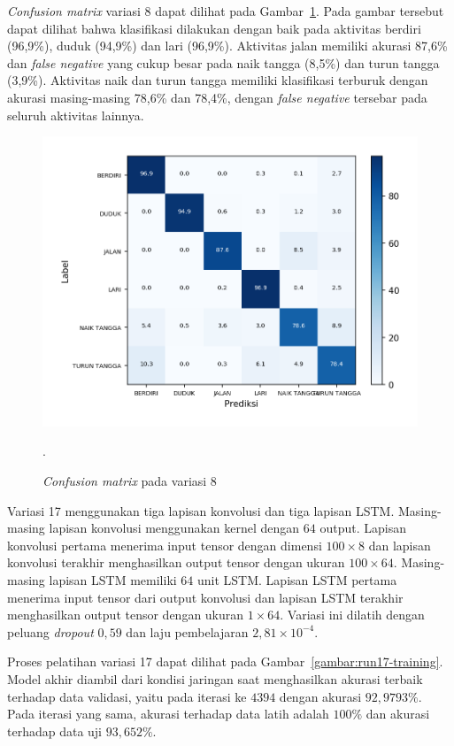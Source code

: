 \textit{Confusion matrix} variasi 8 dapat dilihat pada Gambar~\ref{gambar:run8-confusion-martix}. Pada gambar tersebut dapat dilihat bahwa klasifikasi dilakukan dengan baik pada aktivitas berdiri (96,9\%), duduk (94,9\%) dan lari (96,9\%). Aktivitas jalan memiliki akurasi 87,6\% dan \textit{false negative} yang cukup besar pada naik tangga (8,5\%) dan turun tangga (3,9\%). Aktivitas naik dan turun tangga memiliki klasifikasi terburuk dengan akurasi masing-masing 78,6\% dan 78,4\%, dengan \textit{false negative} tersebar pada seluruh aktivitas lainnya.

\begin{figure}[h!]
    \centering
    \includegraphics[width=13cm]{gambar/hasil-pembahasan/run8-confusion-matrix.png}
    \caption{\textit{Confusion matrix} pada variasi 8}.
    \label{gambar:run8-confusion-martix}
\end{figure}

Variasi 17 menggunakan tiga lapisan konvolusi dan tiga lapisan LSTM\@. Masing-masing lapisan konvolusi menggunakan kernel dengan $64$ output. Lapisan konvolusi pertama menerima input tensor dengan dimensi $100 \times 8$ dan lapisan konvolusi terakhir menghasilkan output tensor dengan ukuran $100 \times 64$. Masing-masing lapisan LSTM memiliki $64$ unit LSTM\@. Lapisan LSTM pertama menerima input tensor dari output konvolusi dan lapisan LSTM terakhir menghasilkan output tensor dengan ukuran $1 \times 64$. Variasi ini dilatih dengan peluang \textit{dropout} $0,59$ dan laju pembelajaran $2,81 \times 10^{-4}$.

Proses pelatihan variasi 17 dapat dilihat pada Gambar~\ref{gambar:run17-training}. Model akhir diambil dari kondisi jaringan saat menghasilkan akurasi terbaik terhadap data validasi, yaitu pada iterasi ke $4394$ dengan akurasi $92,9793\%$. Pada iterasi yang sama, akurasi terhadap data latih adalah $100\%$ dan akurasi terhadap data uji  $93,652\%$.


